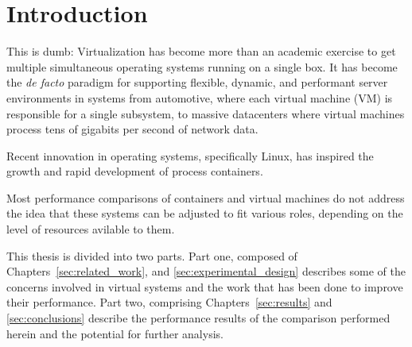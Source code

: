 \chapter{Introduction}
\label{cha:introduction}
\label{sec:introduction}
This is dumb: Virtualization has become more than an academic exercise to get multiple simultaneous operating systems running on a single box.  
It has become the \emph{de facto} paradigm for supporting flexible, dynamic, and performant server environments in systems from automotive, where each virtual machine (VM) is responsible for a single subsystem, to massive datacenters where virtual machines process tens of gigabits per second of network data.

Recent innovation in operating systems, specifically Linux, has inspired the growth and rapid development of process containers.

Most performance comparisons of containers and virtual machines do not address the idea that these systems can be adjusted to fit various roles, depending on the level of resources avilable to them.  


This thesis is divided into two parts.
Part one, composed of Chapters~\ref{sec:related_work}, and \ref{sec:experimental_design} describes some of the concerns involved in virtual systems and the work that has been done to improve their performance.
Part two, comprising Chapters~\ref{sec:results} and \ref{sec:conclusions} describe the performance results of the comparison performed herein and the potential for further analysis.
